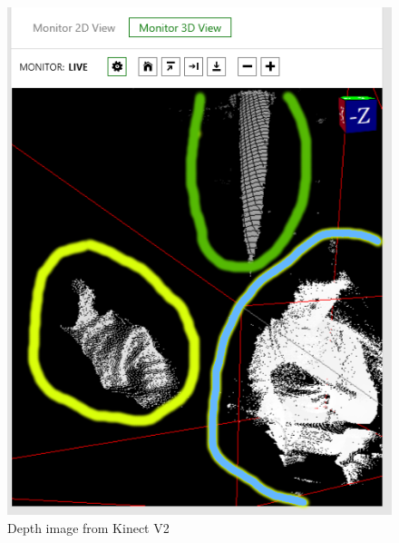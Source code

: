 \documentclass[11pt]{report}
\begin{document}
\begin{center}
	\begin{figure}[H]
		\begin{center}
			\includegraphics[scale=0.5]{pics/KinectDepth}
				\caption{Depth image from Kinect V2}
				\label{KinectDepth}
		\end{center}
	\end{figure}
\end{center}
\end{document}
